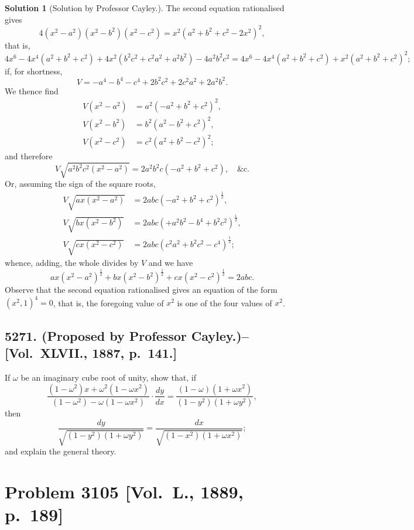 \documentclass[11pt,a4paper]{article}
\theoremstyle{definition}
\newtheorem*{solution}{Solution}
\begin{document}
\begin{solution}[Solution by Professor Cayley.]
The second equation rationalised gives
\[
4(x^2-a^2)(x^2-b^2)(x^2-c^2) = x^2(a^2+b^2+c^2-2x^2)^2,
\]
that is,
\[
4x^6 - 4x^4(a^2+b^2+c^2) + 4x^2(b^2c^2+c^2a^2+a^2b^2) - 4a^2b^2c^2 = 4x^6 - 4x^4(a^2+b^2+c^2) + x^2(a^2+b^2+c^2)^2;
\]
if, for shortness,
\[
V = -a^4-b^4-c^4+2b^2c^2+2c^2a^2+2a^2b^2.
\]
We thence find
\[
\begin{aligned}
V(x^2-a^2) &= a^2(-a^2+b^2+c^2)^2, \\
V(x^2-b^2) &= b^2(a^2-b^2+c^2)^2, \\
V(x^2-c^2) &= c^2(a^2+b^2-c^2)^2;
\end{aligned}
\]
and therefore
\[
V\sqrt{a^2b^2c^2(x^2-a^2)} = 2a^2b^2c(-a^2+b^2+c^2), \quad \&\text{c.}
\]
Or, assuming the sign of the square roots,
\[
\begin{aligned}
V\sqrt{ax(x^2-a^2)} &= 2abc(-a^2+b^2+c^2)^{\frac{1}{2}}, \\
V\sqrt{bx(x^2-b^2)} &= 2abc(+a^2b^2-b^4+b^2c^2)^{\frac{1}{2}}, \\
V\sqrt{cx(x^2-c^2)} &= 2abc(c^2a^2+b^2c^2-c^4)^{\frac{1}{2}};
\end{aligned}
\]
whence, adding, the whole divides by $V$ and we have
\[
ax(x^2-a^2)^{\frac{1}{2}} + bx(x^2-b^2)^{\frac{1}{2}} + cx(x^2-c^2)^{\frac{1}{2}} = 2abc.
\]
Observe that the second equation rationalised gives an equation of the form $(x^2,1)^4=0$, that is, the foregoing value of $x^2$ is one of the four values of $x^2$.
\end{solution}

\newpage

\subsection*{5271. (Proposed by Professor Cayley.)\---[Vol.~XLVII., 1887, p.~141.]}

If $\omega$ be an imaginary cube root of unity, show that, if
\[
\frac{(1-\omega^2)x + \omega^2(1-\omega x^2)}{(1-\omega^2) - \omega(1-\omega x^2)} \cdot \frac{dy}{dx} = \frac{(1-\omega)(1+\omega x^2)}{(1-y^2)(1+\omega y^2)},
\]
then
\[
\frac{dy}{\sqrt{(1-y^2)(1+\omega y^2)}} = \frac{dx}{\sqrt{(1-x^2)(1+\omega x^2)}};
\]
and explain the general theory.

\newpage

\section*{Problem 3105 [Vol.~L., 1889, p.~189]}
\end{document}
